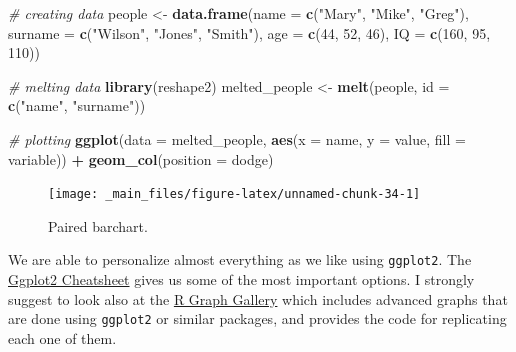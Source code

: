 \documentclass[
]{svmono}
\newenvironment{Shaded}{\begin{snugshade}}{\end{snugshade}}
\newcommand{\AttributeTok}[1]{\textcolor[rgb]{0.13,0.29,0.53}{#1}}
\newcommand{\CommentTok}[1]{\textcolor[rgb]{0.56,0.35,0.01}{\textit{#1}}}
\newcommand{\DecValTok}[1]{\textcolor[rgb]{0.00,0.00,0.81}{#1}}
\newcommand{\FunctionTok}[1]{\textcolor[rgb]{0.13,0.29,0.53}{\textbf{#1}}}
\newcommand{\NormalTok}[1]{#1}
\newcommand{\OtherTok}[1]{\textcolor[rgb]{0.56,0.35,0.01}{#1}}
\newcommand{\SpecialCharTok}[1]{\textcolor[rgb]{0.81,0.36,0.00}{\textbf{#1}}}
\newcommand{\StringTok}[1]{\textcolor[rgb]{0.31,0.60,0.02}{#1}}
\begin{document}
\begin{Shaded}
\begin{Highlighting}[]
\CommentTok{\# creating data}
\NormalTok{people }\OtherTok{\textless{}{-}} \FunctionTok{data.frame}\NormalTok{(}\AttributeTok{name =} \FunctionTok{c}\NormalTok{(}\StringTok{"Mary"}\NormalTok{, }\StringTok{"Mike"}\NormalTok{, }\StringTok{"Greg"}\NormalTok{),}
                     \AttributeTok{surname =} \FunctionTok{c}\NormalTok{(}\StringTok{"Wilson"}\NormalTok{, }\StringTok{"Jones"}\NormalTok{, }\StringTok{"Smith"}\NormalTok{),}
                     \AttributeTok{age =} \FunctionTok{c}\NormalTok{(}\DecValTok{44}\NormalTok{, }\DecValTok{52}\NormalTok{, }\DecValTok{46}\NormalTok{),}
                     \AttributeTok{IQ =} \FunctionTok{c}\NormalTok{(}\DecValTok{160}\NormalTok{, }\DecValTok{95}\NormalTok{, }\DecValTok{110}\NormalTok{))}

\CommentTok{\# melting data}
\FunctionTok{library}\NormalTok{(reshape2)}
\NormalTok{melted\_people }\OtherTok{\textless{}{-}} \FunctionTok{melt}\NormalTok{(people, }\AttributeTok{id =} \FunctionTok{c}\NormalTok{(}\StringTok{"name"}\NormalTok{, }\StringTok{"surname"}\NormalTok{))}

\CommentTok{\# plotting}
\FunctionTok{ggplot}\NormalTok{(}\AttributeTok{data =}\NormalTok{ melted\_people, }\FunctionTok{aes}\NormalTok{(}\AttributeTok{x =}\NormalTok{ name, }\AttributeTok{y =}\NormalTok{ value, }\AttributeTok{fill =}\NormalTok{ variable)) }\SpecialCharTok{+}
  \FunctionTok{geom\_col}\NormalTok{(}\AttributeTok{position =} \StringTok{\textquotesingle{}dodge\textquotesingle{}}\NormalTok{)}
\end{Highlighting}
\end{Shaded}

\begin{figure}[H]

{\centering \texttt{[image: \_main\_files/figure-latex/unnamed-chunk-34-1]} 

}

\caption{Paired barchart.}\label{fig:unnamed-chunk-34}
\end{figure}

We are able to personalize almost everything as we like using \texttt{ggplot2}.
The \href{https://rstudio.com/wp-content/uploads/2015/03/ggplot2-cheatsheet.pdf}{Ggplot2 Cheatsheet} gives us some of the most important options. I strongly suggest to look
also at the \href{https://www.r-graph-gallery.com}{R Graph Gallery} which
includes advanced graphs that are done using \texttt{ggplot2} or similar
packages, and provides the code for replicating each one of them.
\end{document}
